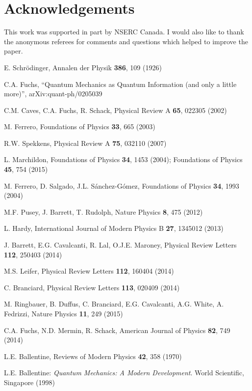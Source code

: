 \documentclass[final,3p,12pt]{elsarticle3}
\begin{document}
\section*{Acknowledgements}
This work was supported in part by NSERC Canada.
I would also like to thank the anonymous referees for comments and
questions which helped to improve the paper.


\begin{thebibliography}{88}

E. Schr\"odinger, Annalen der Physik {\bf 386}, 109 (1926)

C.A. Fuchs, ``Quantum Mechanics as Quantum Information (and only a little more)'',
arXiv:quant-ph/0205039

C.M. Caves, C.A. Fuchs, R. Schack, 
Physical Review A {\bf 65}, 022305 (2002)

M. Ferrero, Foundations of Physics {\bf 33}, 665 (2003)

R.W. Spekkens, Physical Review A {\bf 75}, 032110 (2007)

L. Marchildon, Foundations of Physics {\bf 34}, 1453 (2004);
Foundations of Physics {\bf 45}, 754 (2015)

M. Ferrero, D. Salgado, J.L. S\'anchez-G\'omez, Foundations of Physics {\bf 34}, 1993 (2004)

M.F. Pusey, J. Barrett, T. Rudolph,
Nature Physics {\bf 8}, 475 (2012)

L. Hardy, International Journal of Modern Physics B {\bf 27}, 1345012 (2013)

J. Barrett, E.G. Cavalcanti, R. Lal, O.J.E. Maroney,
Physical Review Letters {\bf 112}, 250403 (2014)

M.S. Leifer, Physical Review Letters {\bf 112}, 160404 (2014)

C. Branciard, Physical Review Letters {\bf 113}, 020409 (2014)

M. Ringbauer, B. Duffus, C. Branciard, E.G. Cavalcanti,	A.G. White, A. Fedrizzi,
Nature Physics {\bf 11}, 249 (2015)

C.A. Fuchs, N.D. Mermin, R. Schack, American Journal of Physics {\bf 82}, 749 (2014)

L.E. Ballentine, Reviews of Modern Physics {\bf 42}, 358 (1970)

L.E. Ballentine: {\it Quantum Mechanics: A Modern Development}.
World Scientific, Singapore (1998)


\end{thebibliography}
\end{document}
